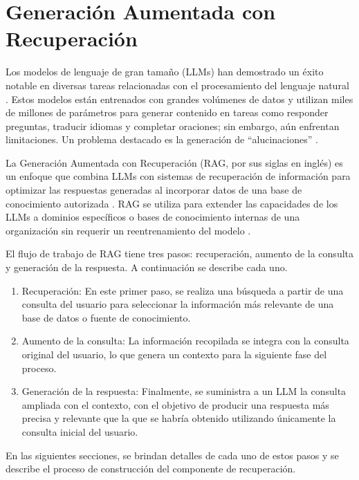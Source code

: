 \chapter{Generación Aumentada con Recuperación}\label{chapter:rag}
Los modelos de lenguaje de gran tamaño (LLMs) han demostrado un éxito notable en diversas tareas relacionadas con el procesamiento del lenguaje natural \cite{makridakis2023largelanguagemodels}. Estos modelos están entrenados con grandes volúmenes de datos y utilizan miles de millones de parámetros para generar contenido en tareas como responder preguntas, traducir idiomas y completar oraciones; sin embargo, aún enfrentan limitaciones. Un problema destacado es la generación de ``alucinaciones'' \cite{zhang2023sirenssongaiocean}.

La Generación Aumentada con Recuperación (RAG, por sus siglas en inglés) es un enfoque que combina LLMs con sistemas de recuperación de información para optimizar las respuestas generadas al incorporar datos de una base de conocimiento autorizada \cite{gao2024retrievalaugmentedgenerationlargelanguage}. RAG se utiliza para extender las capacidades de los LLMs a dominios específicos o bases de conocimiento internas de una organización sin requerir un reentrenamiento del modelo \cite{gao2024retrievalaugmentedgenerationlargelanguage}.

El flujo de trabajo de RAG tiene tres pasos: recuperación, aumento de la consulta y generación de la respuesta. A continuación se describe cada uno.
\begin{enumerate}
     \item Recuperación: En este primer paso, se realiza una búsqueda a partir de una consulta del usuario para seleccionar la información más relevante de una base de datos o fuente de conocimiento.
    \item Aumento de la consulta: La información recopilada se integra con la consulta original del usuario, lo que genera un contexto para la siguiente fase del proceso.
    \item Generación de la respuesta: Finalmente, se suministra a un LLM la consulta ampliada con el contexto, con el objetivo de producir una respuesta más precisa y relevante que la que se habría obtenido utilizando únicamente la consulta inicial del usuario.
\end{enumerate}

En las siguientes secciones, se brindan detalles de cada uno de estos pasos y se describe el proceso de construcción del componente de recuperación. 

